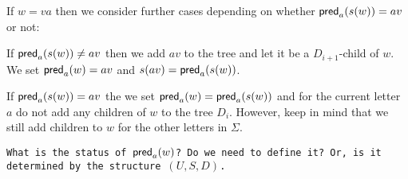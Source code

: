 \documentclass[a4paper]{article}
\begin{document}
\medskip

If $w = va$ then we consider further cases depending on whether
$\mathsf{pred}_a(s(w)) = av$ or not:

If $\mathsf{pred}_a(s(w)) \neq av$ then we add $av$ to the tree and let it be a
$D_{i + 1}$-child of $w$. We set $\mathsf{pred}_a(w) = av$ and $s(av) =
\mathsf{pred}_a(s(w))$.

If $\mathsf{pred}_a(s(w)) = av$ the we set $\mathsf{pred}_a(w) = \mathsf{pred}_a(s(w))$ and for
the current letter $a$ do not add any children of $w$ to the tree $D_i$.
However, keep in mind that we still add children to $w$ for the
other letters in $\Sigma$.

\texttt{What is the status of $\mathsf{pred}_a(w)$? Do we need to define it? Or,
is it determined by the structure $(U,S,D)$.}
\end{document}
